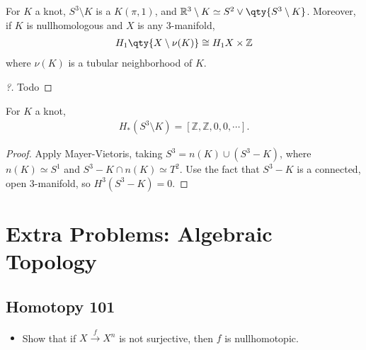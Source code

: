 \begin{proposition}

For \(K\) a knot, \(S^3\setminus K\) is a \(K(\pi, 1)\), and
\({\mathbb{R}}^3 \setminus K \simeq S^2 \vee \qty{S^3 \setminus K}\).
Moreover, if \(K\) is nullhomologous and \(X\) is any 3-manifold,
\begin{align*}
H_1\qty{X\setminus\nu(K)} \cong H_1 X \times{\mathbb{Z}}
\end{align*}
where \(\nu(K)\) is a tubular neighborhood of \(K\).

\end{proposition}

\begin{proof}[?]

Todo

\end{proof}


\begin{proposition}

For \(K\) a knot,
\begin{align*}
H_*(S^3 \setminus K) = [{\mathbb{Z}}, {\mathbb{Z}}, 0, 0, \cdots]
.\end{align*}

\end{proposition}

\begin{proof}

Apply Mayer-Vietoris, taking \(S^3 = n(K) \cup (S^3-K)\), where
\(n(K) \simeq S^1\) and \(S^3-K \cap n(K) \simeq T^2\). Use the fact
that \(S^3-K\) is a connected, open 3-manifold, so \(H^3(S^3-K) =0\).

\end{proof}

\hypertarget{extra-problems-algebraic-topology}{%
\section{Extra Problems: Algebraic
Topology}\label{extra-problems-algebraic-topology}}

\hypertarget{homotopy-101}{%
\subsection{Homotopy 101}\label{homotopy-101}}

\begin{itemize}
\tightlist
\item
  Show that if \(X\xrightarrow{f} X^n\) is not surjective, then \(f\) is
  nullhomotopic.
\end{itemize}

